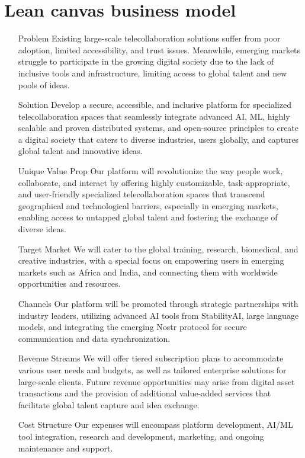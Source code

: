 \section{Lean canvas business model}
\begin{itemize}
\item [Problem] Existing large-scale telecollaboration solutions suffer from poor adoption, limited accessibility, and trust issues. Meanwhile, emerging markets struggle to participate in the growing digital society due to the lack of inclusive tools and infrastructure, limiting access to global talent and new pools of ideas.
\item [Solution] Develop a secure, accessible, and inclusive platform for specialized telecollaboration spaces that seamlessly integrate advanced AI, ML, highly scalable and proven distributed systems, and open-source principles to create a digital society that caters to diverse industries, users globally, and captures global talent and innovative ideas.
\item [Unique Value Prop] Our platform will revolutionize the way people work, collaborate, and interact by offering highly customizable, task-appropriate, and user-friendly specialized telecollaboration spaces that transcend geographical and technological barriers, especially in emerging markets, enabling access to untapped global talent and fostering the exchange of diverse ideas.
\item [Target Market] We will cater to the global training, research, biomedical, and creative industries, with a special focus on empowering users in emerging markets such as Africa and India, and connecting them with worldwide opportunities and resources.
\item [Channels] Our platform will be promoted through strategic partnerships with industry leaders, utilizing advanced AI tools from StabilityAI, large language models, and integrating the emerging Nostr protocol for secure communication and data synchronization.
\item [Revenue Streams] We will offer tiered subscription plans to accommodate various user needs and budgets, as well as tailored enterprise solutions for large-scale clients. Future revenue opportunities may arise from digital asset transactions and the provision of additional value-added services that facilitate global talent capture and idea exchange.
\item [Cost Structure] Our expenses will encompass platform development, AI/ML tool integration, research and development, marketing, and ongoing maintenance and support.

\end{itemize}
